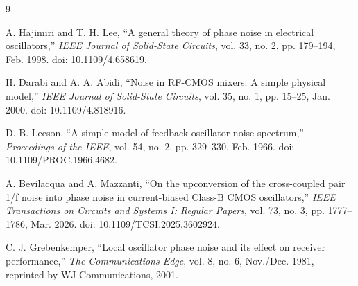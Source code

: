 \documentclass[10pt,a4paper]{article}
\begin{document}
	\begin{thebibliography}{9}
		
		A. Hajimiri and T. H. Lee,
		``A general theory of phase noise in electrical oscillators,''
		\textit{IEEE Journal of Solid-State Circuits},
		vol. 33, no. 2, pp. 179--194, Feb. 1998.
		doi: 10.1109/4.658619.
		
		H. Darabi and A. A. Abidi,
		``Noise in RF-CMOS mixers: A simple physical model,''
		\textit{IEEE Journal of Solid-State Circuits},
		vol. 35, no. 1, pp. 15--25, Jan. 2000.
		doi: 10.1109/4.818916.
		
		D. B. Leeson,
		``A simple model of feedback oscillator noise spectrum,''
		\textit{Proceedings of the IEEE},
		vol. 54, no. 2, pp. 329--330, Feb. 1966.
		doi: 10.1109/PROC.1966.4682.
		
		A. Bevilacqua and A. Mazzanti,
		``On the upconversion of the cross-coupled pair
		1/f noise into phase noise in current-biased
		Class-B CMOS oscillators,''
		\textit{IEEE Transactions on Circuits and Systems I:
			Regular Papers},
		vol. 73, no. 3, pp. 1777--1786, Mar. 2026.
		doi: 10.1109/TCSI.2025.3602924.
		
		C. J. Grebenkemper,
		``Local oscillator phase noise and its effect
		on receiver performance,''
		\textit{The Communications Edge},
		vol. 8, no. 6, Nov./Dec. 1981,
		reprinted by WJ Communications, 2001.
		
		
	\end{thebibliography}
	
\end{document}
